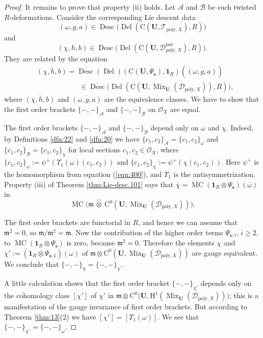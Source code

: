 \documentclass[a4paper, 10pt]{amsart}
\theoremstyle{definition}
\numberwithin{equation}{section}
\newcommand{\opn}{\operatorname}
\newcommand{\ol}{\overline}
\newcommand{\mfrak}[1]{\mathfrak{#1}}
\newcommand{\mcal}[1]{\mathcal{#1}}
\newcommand{\mrm}[1]{\mathrm{#1}}
\newcommand{\bsym}[1]{\boldsymbol{#1}}
\newcommand{\ot}{\otimes}
\newcommand{\hatotimes}[1]{\, \what{{\otimes}}_{#1} \,}
\newcommand{\hot}{\hatotimes{}}
\newcommand{\what}[1]{\widehat{#1}}
\newcommand{\OO}{\mcal{O}}
\newcommand{\m}{\mfrak{m}}
\newcommand{\om}{\omega}
\newcommand{\gerbe}[1]{\bsym{\mcal{#1}}}
\begin{document}
\begin{proof}
It remains to prove that property (ii) holds. Let $\gerbe{A}$ and 
$\gerbe{B}$ be such twisted $R$-deformations. 
Consider the corresponding Lie descent data 
\[ (\om, g, a) \in 
\opn{Desc} \bigl( \opn{Del} (\mrm{C}(\bsym{U}, \mcal{T}_{\mrm{poly},X}), R)
\bigr) \]
and 
\[ (\chi, h, b) \in 
\opn{Desc} \bigl(  \opn{Del} (\mrm{C}(\bsym{U}, 
\mcal{D}^{\mrm{nor}}_{\mrm{poly},X}) , R) \bigr) . \]
They are related by the equation
\[ \begin{aligned}
& \ol{(\chi, h, b)} = \ol{\opn{Desc}} (\opn{Del})
(\mrm{C}(\bsym{U}, \Psi_{\bsym{s}}), \bsym{1}_R) ( \ol{(\om, g, a)} ) 
\\
& \qquad \qquad \qquad \in 
\ol{\opn{Desc}} \bigl(  \opn{Del}(\mrm{C} (\bsym{U}, 
\opn{Mix}_{\bsym{U}} (\mcal{D}_{\mrm{poly},X})), R) \bigr) ,
\end{aligned} \]
where $\ol{(\chi, h, b)}$ and $\ol{(\om, g, a)}$ are the equivalence classes.
We have to show that the first order brackets
$\{ -,- \}_{\gerbe{A}}$ and $\{ -,- \}_{\gerbe{B}}$ on 
$\mcal{O}_X$ are equal.

The first order brackets 
$\{ -,- \}_{\gerbe{A}}$ and $\{ -,- \}_{\gerbe{B}}$
depend only on $\om$ and $\chi$. Indeed, by Definitions \ref{dfn:22} and
\ref{dfn:20} we have
$\{ c_1, c_2 \}_{\gerbe{A}} = \{ c_1, c_2 \}_{\om}$
and 
$\{ c_1, c_2 \}_{\gerbe{B}} = \{ c_1, c_2 \}_{\chi}$
for local sections $c_1, c_2 \in \OO_X$,
where 
$\{ c_1, c_2 \}_{\om} := \psi^+(\Upsilon_1(\om)(c_1, c_2))$
and 
$\{ c_1, c_2 \}_{\chi} := \psi^+(\chi(c_1, c_2))$. 
Here $\psi^+$ is the homomorphism from equation (\ref{eqn:400}), and 
$\Upsilon_1$ is the antisymmetrization.
Property (iii) of Theorem \ref{thm:Lie-desc.101} says that
$\ol{\chi} = \ol{\opn{MC}}(\bsym{1}_R \ot \Psi_{\bsym{s}})( \ol{\om} )$
in 
\[ \ol{\opn{MC}} \bigl(\m \hot 
\mrm{C}^0(\bsym{U}, \opn{Mix}_{\bsym{U}} (\mcal{D}_{\mrm{poly},X}))  \bigr) . \]

The first order brackets are functorial in $R$, and hence
we can assume that $\m^2 = 0$, so $\m / \m^2 = \m$. 
Now the contribution of the higher order terms $\Psi_{\bsym{s}; i}$, $i \geq 2$,
to $\opn{MC}(\bsym{1}_R \ot \Psi_{\bsym{s}})$ is zero, because 
$\m^2 = 0$. Therefore the elements
$\chi$ and 
$\chi' := (\bsym{1}_R \ot \Psi_{\bsym{s}; 1})(\om)$
of 
$\m \ot \mrm{C}^0(\bsym{U}, \opn{Mix}_{\bsym{U}} (\mcal{D}_{\mrm{poly},X}))$
are gauge equivalent.
We conclude that $\{ -,- \}_{\chi} = \{ -,- \}_{\chi'}$.

A little calculation shows that the first order bracket $\{ -,- \}_{\chi'}$
depends only on the cohomology class $[\chi']$ of $\chi'$ in
$\m \ot \mrm{C}^0 \bigl( \bsym{U}, 
\mrm{H}^1 ( \opn{Mix}_{\bsym{U}} (\mcal{D}_{\mrm{poly},X})) \bigr)$;
this is a manifestation of the gauge invariance of first order brackets.
But according to Theorem \ref{thm:13}(2) we have 
$[\chi'] = [\Upsilon_1(\om)]$.
We see that $\{ -,- \}_{\chi'} = \{ -,- \}_{\om}$.
\end{proof}
\end{document}
